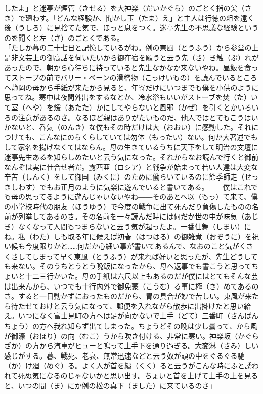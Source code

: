 したよ」と迷亭が煙管（きせる）を大神楽（だいかぐら）のごとく指の尖（さき）で廻わす。「どんな経験か、聞かし玉（たま）え」と主人は行徳の俎を遠く後（うしろ）に見捨てた気で、ほっと息をつく。迷亭先生の不思議な経験というのを聞くと左（さ）のごとくである。\\
「たしか暮の二十七日と記憶しているがね。例の東風（とうふう）から参堂の上是非文芸上の御高話を伺いたいから御在宿を願うと云う先（さ）き触（ぶ）れがあったので、朝から心待ちに待っていると先生なかなか来ないやね。昼飯を食ってストーブの前でバリー・ペーンの滑稽物（こっけいもの）を読んでいるところへ静岡の母から手紙が来たから見ると、年寄だけにいつまでも僕を小供のように思ってね。寒中は夜間外出をするなとか、冷水浴もいいがストーブを焚（た）いて室（へや）を煖（あたた）かにしてやらないと風邪（かぜ）を引くとかいろいろの注意があるのさ。なるほど親はありがたいものだ、他人ではとてもこうはいかないと、呑気（のんき）な僕もその時だけは大（おおい）に感動した。それにつけても、こんなにのらくらしていては勿体（もったい）ない。何か大著述でもして家名を揚げなくてはならん。母の生きているうちに天下をして明治の文壇に迷亭先生あるを知らしめたいと云う気になった。それからなお読んで行くと御前なんぞは実に仕合せ者だ。露西亜（ロシア）と戦争が始まって若い人達は大変な辛苦（しんく）をして御国（みくに）のために働らいているのに節季師走（せっきしわす）でもお正月のように気楽に遊んでいると書いてある。――僕はこれでも母の思ってるように遊んじゃいないやね――そのあとへ以（もっ）て来て、僕の小学校時代の朋友（ほうゆう）で今度の戦争に出て死んだり負傷したものの名前が列挙してあるのさ。その名前を一々読んだ時には何だか世の中が味気（あじき）なくなって人間もつまらないと云う気が起ったよ。一番仕舞（しまい）にね。私（わた）しも取る年に候えば初春（はつはる）の御雑煮（おぞうに）を祝い候も今度限りかと\ldots{}\ldots{}何だか心細い事が書いてあるんで、なおのこと気がくさくさしてしまって早く東風（とうふう）が来れば好いと思ったが、先生どうしても来ない。そのうちとうとう晩飯になったから、母へ返事でも書こうと思ってちょいと十二三行かいた。母の手紙は六尺以上もあるのだが僕にはとてもそんな芸は出来んから、いつでも十行内外で御免蒙（こうむ）る事に極（き）めてあるのさ。すると一日動かずにおったものだから、胃の具合が妙で苦しい。東風が来たら待たせておけと云う気になって、郵便を入れながら散歩に出掛けたと思い給え。いつになく富士見町の方へは足が向かないで土手（どて）三番町（さんばんちょう）の方へ我れ知らず出てしまった。ちょうどその晩は少し曇って、から風が御濠（おほり）の向（むこ）うから吹き付ける、非常に寒い。神楽坂（かぐらざか）の方から汽車がヒューと鳴って土手下を通り過ぎる。大変淋（さみ）しい感じがする。暮、戦死、老衰、無常迅速などと云う奴が頭の中をぐるぐる馳（か）け廻（めぐ）る。よく人が首を縊（くく）ると云うがこんな時にふと誘われて死ぬ気になるのじゃないかと思い出す。ちょいと首を上げて土手の上を見ると、いつの間（ま）にか例の松の真下（ました）に来ているのさ」\\
